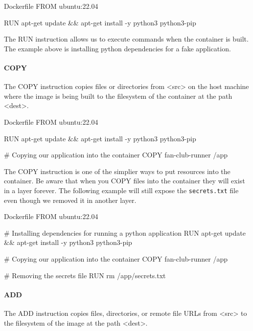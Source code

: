\documentclass{csse4400}
\begin{document}
\begin{code}[language=docker,numbers=none]{Dockerfile}
FROM ubuntu:22.04

RUN apt-get update && apt-get install -y python3 python3-pip
\end{code}

The RUN instruction allows us to execute commands when the container is built.
The example above is installing python dependencies for a fake application.

\paragraph{COPY}
The COPY instruction copies files or directories from <src> on the host machine where the image is being built to the filesystem of the container at the path <dest>.

\begin{code}[language=docker,numbers=none]{Dockerfile}
FROM ubuntu:22.04

RUN apt-get update && apt-get install -y python3 python3-pip

# Copying our application into the container
COPY fan-club-runner /app
\end{code}

The COPY instruction is one of the simplier ways to put resources into the container.
Be aware that when you COPY files into the container they will exist in a layer forever.
The following example will still expose the \texttt{secrets.txt} file even though we removed it in another layer.

\begin{code}[language=docker,numbers=none]{Dockerfile}
FROM ubuntu:22.04

# Installing dependencies for running a python application
RUN apt-get update && apt-get install -y python3 python3-pip

# Copying our application into the container
COPY fan-club-runner /app

# Removing the secrets file
RUN rm /app/secrets.txt
\end{code}

\paragraph{ADD}
The ADD instruction copies files, directories, or remote file URLs from <src> to the filesystem of the image at the path <dest>.
\end{document}
